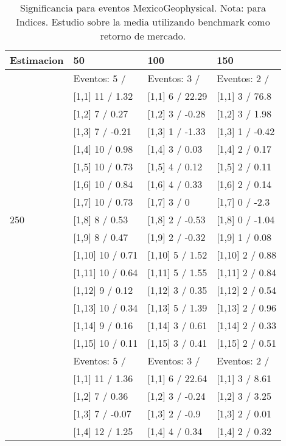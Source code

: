 \begin{table}

\caption{Significancia para eventos MexicoGeophysical. Nota: para Indices. Estudio sobre la media utilizando benchmark como retorno de mercado.}
\centering
\begin{tabular}[t]{llll}
\toprule
Estimacion & 50 & 100 & 150\\
\midrule
 & Eventos:  5 / & Eventos:  3 / & Eventos:  2 /\\
 & {}[1,1] 11  / 1.32 & {}[1,1] 6  / 22.29 & {}[1,1] 3  / 76.8\\
 & {}[1,2] 7  / 0.27 & {}[1,2] 3  / -0.28 & {}[1,2] 3  / 1.98\\
 & {}[1,3] 7  / -0.21 & {}[1,3] 1  / -1.33 & {}[1,3] 1  / -0.42\\
 & {}[1,4] 10  / 0.98 & {}[1,4] 3  / 0.03 & {}[1,4] 2  / 0.17\\
\addlinespace
 & {}[1,5] 10  / 0.73 & {}[1,5] 4  / 0.12 & {}[1,5] 2  / 0.11\\
 & {}[1,6] 10  / 0.84 & {}[1,6] 4  / 0.33 & {}[1,6] 2  / 0.14\\
 & {}[1,7] 10  / 0.73 & {}[1,7] 3  / 0 & {}[1,7] 0  / -2.3\\
250 & {}[1,8] 8  / 0.53 & {}[1,8] 2  / -0.53 & {}[1,8] 0  / -1.04\\
 & {}[1,9] 8  / 0.47 & {}[1,9] 2  / -0.32 & {}[1,9] 1  / 0.08\\
\addlinespace
 & {}[1,10] 10  / 0.71 & {}[1,10] 5  / 1.52 & {}[1,10] 2  / 0.88\\
 & {}[1,11] 10  / 0.64 & {}[1,11] 5  / 1.55 & {}[1,11] 2  / 0.84\\
 & {}[1,12] 9  / 0.12 & {}[1,12] 3  / 0.35 & {}[1,12] 2  / 0.54\\
 & {}[1,13] 10  / 0.34 & {}[1,13] 5  / 1.39 & {}[1,13] 2  / 0.96\\
 & {}[1,14] 9  / 0.16 & {}[1,14] 3  / 0.61 & {}[1,14] 2  / 0.33\\
\addlinespace
 & {}[1,15] 10  / 0.11 & {}[1,15] 3  / 0.41 & {}[1,15] 2  / 0.51\\
 & Eventos:  5 / & Eventos:  3 / & Eventos:  2 /\\
 & {}[1,1] 11  / 1.36 & {}[1,1] 6  / 22.64 & {}[1,1] 3  / 8.61\\
 & {}[1,2] 7  / 0.36 & {}[1,2] 3  / -0.24 & {}[1,2] 3  / 3.25\\
 & {}[1,3] 7  / -0.07 & {}[1,3] 2  / -0.9 & {}[1,3] 2  / 0.01\\
\addlinespace
 & {}[1,4] 12  / 1.25 & {}[1,4] 4  / 0.34 & {}[1,4] 2  / 0.32\\

\end{tabular}
\end{table}
